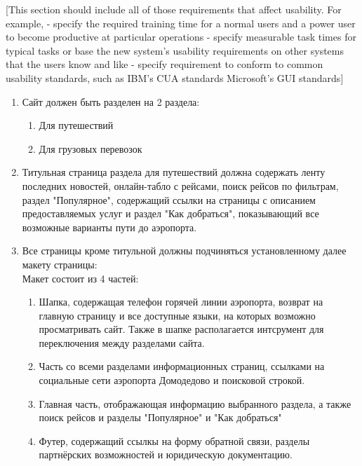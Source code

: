 [This section should include all of those requirements
 that affect usability. For example,
- specify the required training time for a normal
  users and a power user to become productive at
  particular operations
- specify measurable task times for typical tasks
  or base the new system’s usability requirements
  on other systems that the users know and like
- specify requirement to conform to common usability
  standards, such as IBM’s CUA standards Microsoft’s 
  GUI standards]

\begin{enumerate}
  \item Сайт должен быть разделен на 2 раздела:
    \begin{enumerate}
      \item Для путешествий
      \item Для грузовых перевозок
    \end{enumerate} 

  \item Титульная страница раздела для путешествий должна содержать ленту последних новостей,
  онлайн-табло с рейсами, поиск рейсов по фильтрам, раздел "Популярное", содержащий ссылки на страницы с описанием
  предоставляемых услуг и раздел "Как добраться", показывающий все возможные варианты пути до аэропорта.

  \item Все страницы кроме титульной должны подчиняться установленному далее макету страницы:\\
  Макет состоит из 4 частей:
  \begin{enumerate}
    \item Шапка, содержащая телефон горячей линии аэропорта, возврат на главную страницу и все доступные языки, на которых возможно 
    просматривать сайт. Также в шапке располагается интсрумент для переключения между разделами сайта.
    \item Часть со всеми разделами информационных страниц, ссылками на социальные сети аэропорта Домодедово и поисковой строкой.
    \item Главная часть, отображающая информацию выбранного раздела, а также поиск рейсов и разделы "Популярное" и "Как добраться"
    \item Футер, содержащий ссылкы на форму обратной связи, разделы партнёрских возможностей и юридическую документацию.
  \end{enumerate}


\end{enumerate}
